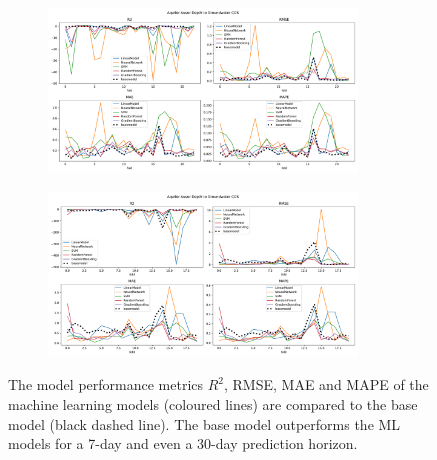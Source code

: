 \documentclass{article}
\begin{document}
\begin{figure}
     \centering
     \begin{subfigure}
         \centering
         \includegraphics[width=0.9\textwidth]{figs/D7_pearson_Aquifer_Auser_Depth_to_Groundwater_COS_folds.pdf}
     \end{subfigure}
% 
     \begin{subfigure}
         \centering
         \includegraphics[width=0.9\textwidth]{figs/D30_pearson_Aquifer_Auser_Depth_to_Groundwater_COS_folds.pdf}
     \end{subfigure}

\caption{The model performance metrics $R^2$, RMSE, MAE and MAPE of the machine learning models (coloured lines) are compared to the base model (black dashed line). The base model outperforms the ML models for a 7-day and even a 30-day prediction horizon.}
\label{fig:auser_7d}
\end{figure}





\begin{table}[p]
\centering
{}
\caption{Features selection method and optimal model parameter for GradientBoosting. Hyper parameter not mentioned in this table are not considered during hyper parameter tuning.}
\label{tab:gb_optim}
\end{table}
\end{document}

